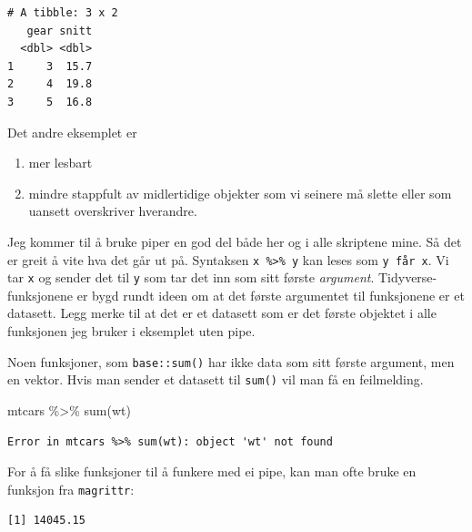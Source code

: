 \documentclass[
  letterpaper,
  DIV=11,
  numbers=noendperiod]{scrreprt}
\newenvironment{Shaded}{\begin{snugshade}}{\end{snugshade}}
\newcommand{\FunctionTok}[1]{\textcolor[rgb]{0.28,0.35,0.67}{#1}}
\newcommand{\NormalTok}[1]{\textcolor[rgb]{0.00,0.23,0.31}{#1}}
\newcommand{\SpecialCharTok}[1]{\textcolor[rgb]{0.37,0.37,0.37}{#1}}
\providecommand{\tightlist}{%
  \setlength{\itemsep}{0pt}\setlength{\parskip}{0pt}}\usepackage{longtable,booktabs,array}
\begin{document}
\begin{verbatim}
# A tibble: 3 x 2
   gear snitt
  <dbl> <dbl>
1     3  15.7
2     4  19.8
3     5  16.8
\end{verbatim}

Det andre eksemplet er

\begin{enumerate}
\def\labelenumi{\arabic{enumi}.}
\tightlist
\item
  mer lesbart
\item
  mindre stappfult av midlertidige objekter som vi seinere må slette
  eller som uansett overskriver hverandre.
\end{enumerate}

Jeg kommer til å bruke piper en god del både her og i alle skriptene
mine. Så det er greit å vite hva det går ut på. Syntaksen
\texttt{x\ \%\textgreater{}\%\ y} kan leses som \texttt{y\ får\ x}. Vi
tar \texttt{x} og sender det til \texttt{y} som tar det inn som sitt
første \emph{argument}. Tidyverse-funksjonene er bygd rundt ideen om at
det første argumentet til funksjonene er et datasett. Legg merke til at
det er et datasett som er det første objektet i alle funksjonen jeg
bruker i eksemplet uten pipe.

Noen funksjoner, som \texttt{base::sum()} har ikke data som sitt første
argument, men en vektor. Hvis man sender et datasett til \texttt{sum()}
vil man få en feilmelding.

\begin{Shaded}
\begin{Highlighting}[]
\NormalTok{mtcars }\SpecialCharTok{\%\textgreater{}\%} \FunctionTok{sum}\NormalTok{(wt)}
\end{Highlighting}
\end{Shaded}

\begin{verbatim}
Error in mtcars %>% sum(wt): object 'wt' not found
\end{verbatim}

For å få slike funksjoner til å funkere med ei pipe, kan man ofte bruke
en funksjon fra \texttt{magrittr}:

\begin{Shaded}
\end{Shaded}

\begin{verbatim}
[1] 14045.15
\end{verbatim}
\end{document}
